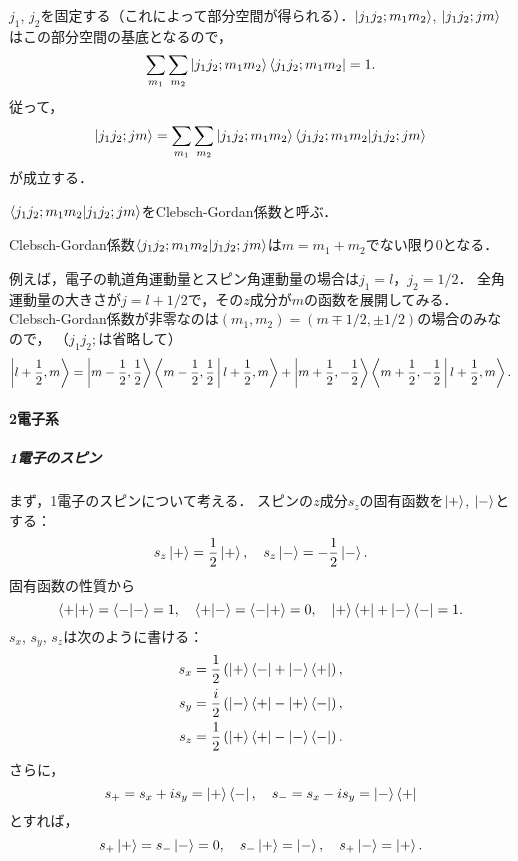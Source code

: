 \documentclass[a4paper]{ltjsreport}
\begin{document}
$j_1$, $j_2$を固定する（これによって部分空間が得られる）．$\ket{j_1j_2; m_1m_2}$, $\ket{j_1j_2; jm}$はこの部分空間の基底となるので，
\begin{align}
  \sum_{m_1}\sum_{m_2} \ket{j_1j_2; m_1m_2}\bra{j_1j_2; m_1m_2} = 1 .
\end{align}
従って，
\begin{align}
  \ket{j_1j_2; jm} = \sum_{m_1}\sum_{m_2} \ket{j_1j_2; m_1m_2} \braket{j_1j_2; m_1m_2 | j_1j_2; jm}
\end{align}
が成立する．

\begin{screen}
  \begin{dfn}
    $\braket{j_1j_2; m_1m_2 | j_1j_2; jm}$をClebsch-Gordan係数と呼ぶ．
  \end{dfn}
\end{screen}

\begin{screen}
  \begin{thm}
    Clebsch-Gordan係数$\braket{j_1j_2; m_1m_2 | j_1j_2; jm}$は$m = m_1 + m_2$でない限り$0$となる．
  \end{thm}
\end{screen}

例えば，電子の軌道角運動量とスピン角運動量の場合は$j_1 = l$，$j_2 = 1/2$．
全角運動量の大きさが$j = l + 1/2$で，その$z$成分が$m$の函数を展開してみる．
Clebsch-Gordan係数が非零なのは$(m_1, m_2) = (m \mp 1/2, \pm 1/2)$の場合のみなので，
（$j_1j_2;$は省略して）
\begin{align}
  \begin{split}
    \Ket{l + \frac{1}{2}, m} = \Ket{m - \frac{1}{2}, \frac{1}{2} } \Braket{ m - \frac{1}{2}, \frac{1}{2} | l + \frac{1}{2}, m }
    + \Ket{m + \frac{1}{2}, -\frac{1}{2} } \Braket{ m + \frac{1}{2}, -\frac{1}{2} | l + \frac{1}{2}, m } .
  \end{split}
\end{align}

\paragraph{2電子系}
\subparagraph{1電子のスピン}
まず，1電子のスピンについて考える．
スピンの$z$成分$s_z$の固有函数を$\ket{+}$, $\ket{-}$とする：
\[ s_z \ket{+} = \frac{1}{2} \ket{+} , \quad s_z \ket{-} = -\frac{1}{2} \ket{-} . \]
固有函数の性質から
\[ \braket{+|+} = \braket{-|-} = 1 , \quad \braket{+|-} = \braket{-|+} = 0 , \quad \ket{+}\bra{+} + \ket{-}\bra{-} = 1 . \]
$s_x$, $s_y$, $s_z$は次のように書ける：
\begin{align*}
  s_x &= \frac{1}{2} \left( \ket{+}\bra{-} + \ket{-}\bra{+} \right) , \\
  s_y &= \frac{i}{2} \left( \ket{-}\bra{+} - \ket{+}\bra{-} \right) , \\
  s_z &= \frac{1}{2} \left( \ket{+}\bra{+} - \ket{-}\bra{-} \right) .
\end{align*}
さらに，
\[ s_+ = s_x + is_y = \ket{+}\bra{-} , \quad s_- = s_x - is_y = \ket{-}\bra{+} \]
とすれば，
\[ s_+ \ket{+} = s_- \ket{-} = 0 , \quad s_- \ket{+} = \ket{-} , \quad s_+ \ket{-} = \ket{+} . \]
\end{document}
